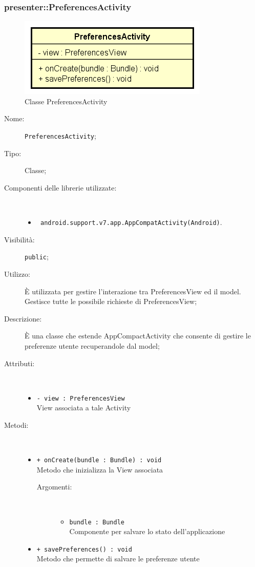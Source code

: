 \documentclass[../DefinizioneDiProdotto.tex]{subfiles}
\begin{document}
\subsubsection{presenter::PreferencesActivity}

    \begin{figure}[H]
        \centering
        \includegraphics{img/PreferencesActivity.png}
        \caption{Classe PreferencesActivity}\label{fig:presenter::PreferencesActivity} 
    \end{figure}
    \begin{description}
\item[Nome:] \texttt{PreferencesActivity};
\item[Tipo:] Classe;
\item[Componenti delle librerie utilizzate:] \
\begin{itemize}
\item \texttt{ android.support.v7.app.AppCompatActivity(Android)}.

\end{itemize}
\item[Visibilità:] \texttt{public};
\item[Utilizzo:] È utilizzata per gestire l'interazione tra PreferencesView ed il model. Gestisce tutte le possibile richieste di PreferencesView;
\item[Descrizione:] È una classe che estende AppCompactActivity che consente di gestire le preferenze utente recuperandole dal model;
\item[Attributi:] \
\begin{itemize}
\item \texttt{- view : PreferencesView}\\
View associata a tale Activity

\end{itemize}
\item[Metodi:] \
\begin{itemize}
\item \texttt{+ onCreate(bundle : Bundle) : void}\\
Metodo che inizializza la View associata
 \begin{description}
\item[Argomenti:] \
\begin{itemize}
\item \texttt{bundle : Bundle}\\
Componente per salvare lo stato dell'applicazione\end{itemize}
\end{description}
\item \texttt{+ savePreferences() : void}\\
Metodo che permette di salvare le preferenze utente
 \end{itemize}
\end{description}
\end{document}
